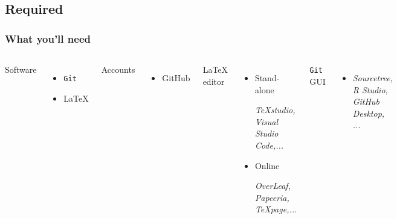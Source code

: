 \documentclass{beamer}
\begin{document}
\subsection{Required}

\begin{frame}
    \frametitle{What you'll need}

\begin{columns}


Software
    \begin{itemize}
        \item \texttt{Git}
        \item \LaTeX
    \end{itemize}
Accounts
    \begin{itemize}
        \item GitHub\footnotemark
    \end{itemize}

\LaTeX{} editor
    \begin{itemize}
        \item Stand-alone\\
        	{\tiny \emph{TeXstudio, Visual Studio Code,...} \par}
        \item Online\\
        	{\tiny \emph{OverLeaf, Papeeria, TeXpage,...} \par}
    \end{itemize}
\texttt{Git} GUI 
	\begin{itemize}
        \item {\tiny \emph{Sourcetree, R Studio, GitHub Desktop, ...}\par }
     \end{itemize}


\end{columns}
\end{frame}
\end{document}
